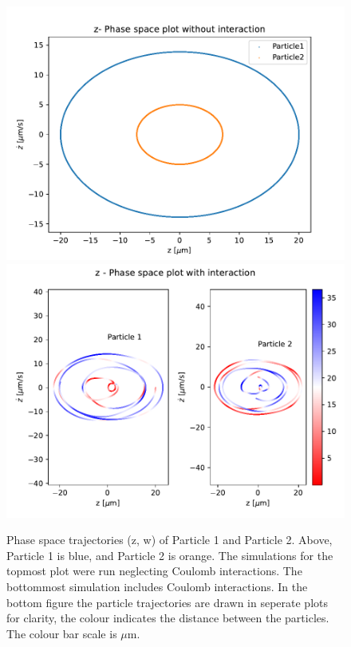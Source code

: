 \begin{figure}
\centering
\includegraphics[scale = 0.7]{../figures/z_phase_noint.pdf}
\includegraphics[scale = 0.7]{../figures/z_phase_int.pdf}
\caption{Phase space trajectories (z, w) of Particle 1 and Particle 2. Above, Particle 1 is blue, and Particle 2 is orange.
The simulations for the topmost plot were run neglecting Coulomb interactions. The bottommost simulation includes Coulomb interactions. In the bottom figure the particle trajectories are drawn in
seperate plots for clarity, the colour indicates the distance between the particles. The colour bar scale is
$\mu$m.}
\label{fig:phase_z}
\end{figure}

